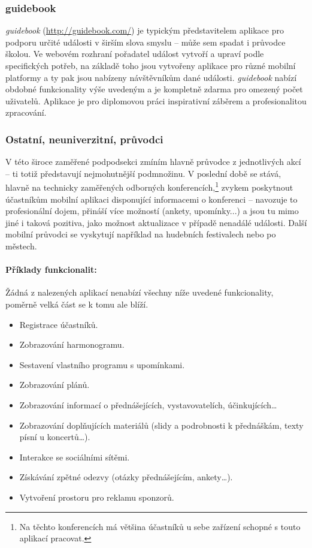 \subsubsection{guidebook}
\emph{guidebook} (\url{http://guidebook.com/}) je typickým představitelem aplikace pro podporu určité události v širším slova smyslu -- může sem spadat i průvodce školou. Ve webovém rozhraní pořadatel událost vytvoří a upraví podle specifických potřeb, na základě toho jsou vytvořeny aplikace pro různé mobilní platformy a ty pak jsou nabízeny návštěvníkům dané události. \textit{guidebook} nabízí obdobné funkcionality výše uvedeným a je kompletně zdarma pro omezený počet uživatelů. Aplikace je pro diplomovou práci inspirativní záběrem a profesionalitou zpracování.

\subsubsection{Ostatní, neuniverzitní, průvodci}
V této široce zaměřené podpodsekci zmíním hlavně průvodce z jednotlivých akcí -- ti totiž představují nejmohutnější podmnožinu. V poslední době se stává, hlavně na technicky zaměřených odborných konferencích,\footnote{Na těchto konferencích má většina účastníků u sebe zařízení schopné s touto aplikací pracovat.} zvykem poskytnout účastníkům mobilní aplikaci disponující informacemi o konferenci -- navozuje to profesionální dojem, přináší více možností (ankety, upomínky...) a jsou tu mimo jiné i taková pozitiva, jako možnost aktualizace v případě nenadálé události. Další mobilní průvodci se vyskytují například na hudebních festivalech nebo po městech.

\paragraph{Příklady funkcionalit:}
Žádná z nalezených aplikací nenabízí všechny níže uvedené funkcionality, poměrně velká část se k tomu ale blíží.
\begin{itemize}
\item Registrace účastníků.
\item Zobrazování harmonogramu.
\item Sestavení vlastního programu s upomínkami.
\item Zobrazování plánů.
\item Zobrazování informací o přednášejících, vystavovatelích, účinkujících\dots
\item Zobrazování doplňujících materiálů (slidy a podrobnosti k přednáškám, texty písní u koncertů\dots).
\item Interakce se sociálními sítěmi.
\item Získávání zpětné odezvy (otázky přednášejícím, ankety\dots).
\item Vytvoření prostoru pro reklamu sponzorů. 
\end{itemize}

